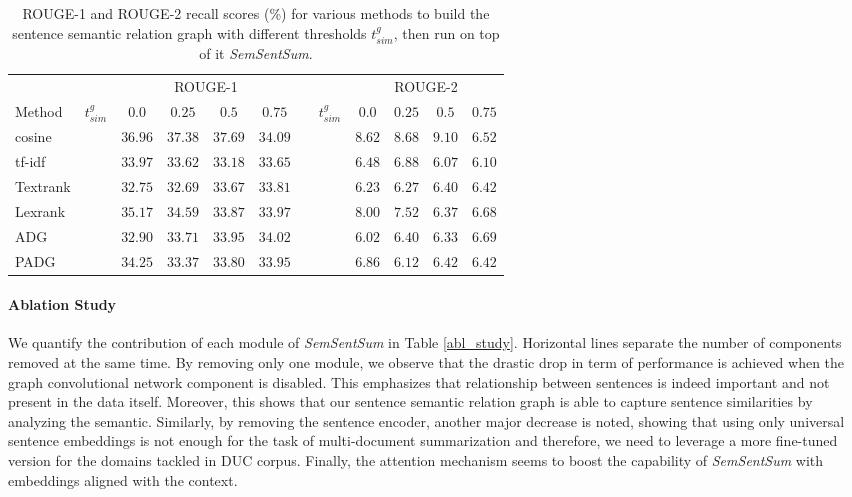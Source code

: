 \documentclass{article}
\begin{document}
\begin{table}
  \caption{ROUGE-1 and ROUGE-2 recall scores (\%) for various methods to build the sentence semantic relation graph with different thresholds $t_{sim}^g$, then run on top of it \textit{SemSentSum}.}
  \label{ssrg_perf}
  \centering
  \begin{tabular}{lccccccccccc}
    \toprule
    & & \multicolumn{4}{c}{ROUGE-1} & & & \multicolumn{4}{c}{ROUGE-2}  \\
    Method & $t_{sim}^g$ & $0.0$ & $0.25$ & $0.5$ & $0.75$ & & $t_{sim}^g$ & $0.0$ & $0.25$ & $0.5$ & $0.75$\\
    \hline
    cosine & & $36.96$ & $37.38$ & $37.69$ & $34.09$ & & & $8.62$ & $8.68$ & $9.10$ & $6.52$\\
    tf-idf & & $33.97$ & $33.62$ & $33.18$ & $33.65$ & & & $6.48$ & $6.88$ & $6.07$ & $6.10$\\
    Textrank & & $32.75$ & $32.69$ & $33.67$ & $33.81$ & & & $6.23$ & $6.27$ & $6.40$ & $6.42$\\
    Lexrank & & $35.17$ & $34.59$ & $33.87$ & $33.97$ & & & $8.00$ & $7.52$ & $6.37$ & $6.68$\\
    ADG & & $32.90$ & $33.71$ & $33.95$ & $34.02$ & & & $6.02$ & $6.40$ & $6.33$ & $6.69$\\
    PADG & & $34.25$ & $33.37$ & $33.80$ & $33.95$ & & & $6.86$ & $6.12$ & $6.42$ & $6.42$\\
    \bottomrule
  \end{tabular}
\end{table}

\paragraph{Ablation Study}
We quantify the contribution of each module of \textit{SemSentSum} in Table \ref{abl_study}. Horizontal lines separate the number of components removed at the same time. By removing only one module, we observe that the drastic drop in term of performance is achieved when the graph convolutional network component is disabled. This emphasizes that relationship between sentences is indeed important and not present in the data itself. Moreover, this shows that our sentence semantic relation graph is able to capture sentence similarities by analyzing the semantic. Similarly, by removing the sentence encoder, another major decrease is noted, showing that using only universal sentence embeddings is not enough for the task of multi-document summarization and therefore, we need to leverage a more fine-tuned version for the domains tackled in DUC corpus. Finally, the attention mechanism seems to boost the capability of \textit{SemSentSum} with embeddings aligned with the context.
\end{document}

